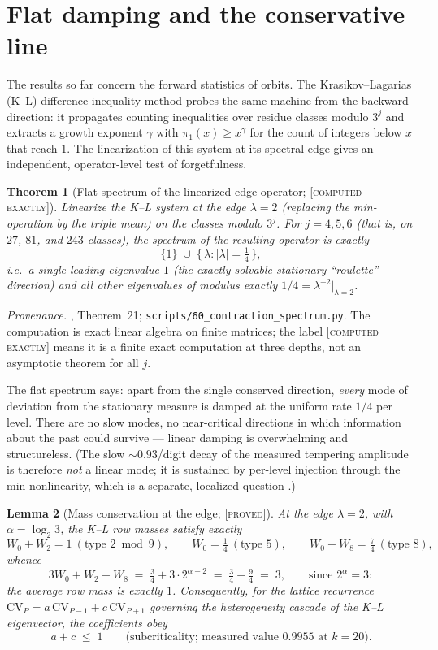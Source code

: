 \documentclass[11pt]{article}
\newtheorem{theorem}{Theorem}[section]
\newtheorem{lemma}[theorem]{Lemma}
\theoremstyle{definition}
\newcommand{\PROVED}{\textup{[\textsc{proved}]}}
\newcommand{\COMPUTED}{\textup{[\textsc{computed exactly}]}}
\begin{document}
\section{Flat damping and the conservative line}

The results so far concern the forward statistics of orbits. The Krasikov--Lagarias
(K--L) difference-inequality method \cite{KrasikovLagarias2003} probes the same machine
from the backward direction: it propagates counting inequalities over residue classes
modulo $3^j$ and extracts a growth exponent $\gamma$ with
$\pi_1(x) \geq x^{\gamma}$ for the count of integers below $x$ that reach $1$. The
linearization of this system at its spectral edge gives an independent, operator-level
test of forgetfulness.

\begin{theorem}[Flat spectrum of the linearized edge operator; \COMPUTED]\label{thm:spectrum}
Linearize the K--L system at the edge $\lambda = 2$ (replacing the min-operation by the
triple mean) on the classes modulo $3^j$. For $j = 4, 5, 6$ (that is, on $27$, $81$,
and $243$ classes), the spectrum of the resulting operator is exactly
\[
\{1\} \;\cup\; \{\,\lambda : |\lambda| = \tfrac14\,\},
\]
i.e.\ a single leading eigenvalue $1$ (the exactly solvable stationary ``roulette''
direction) and \emph{all} other eigenvalues of modulus exactly
$1/4 = \lambda^{-2}\big|_{\lambda = 2}$.
\end{theorem}

\emph{Provenance.} \cite{Note2026}, Theorem~21; \texttt{scripts/60\_contraction\_spectrum.py}.
The computation is exact linear algebra on finite matrices; the label \COMPUTED{} means
it is a finite exact computation at three depths, not an asymptotic theorem for all $j$.

The flat spectrum says: apart from the single conserved direction, \emph{every} mode of
deviation from the stationary measure is damped at the uniform rate $1/4$ per level.
There are no slow modes, no near-critical directions in which information about the past
could survive --- linear damping is overwhelming and structureless. (The slow
$\sim 0.93$/digit decay of the measured tempering amplitude is therefore \emph{not} a
linear mode; it is sustained by per-level injection through the min-nonlinearity, which
is a separate, localized question \cite{Note2026}.)

\begin{lemma}[Mass conservation at the edge; \PROVED]\label{lem:mass}
At the edge $\lambda = 2$, with $\alpha = \log_2 3$, the K--L row masses satisfy
exactly
\[
W_0 + W_2 = 1 \ (\text{type } 2 \bmod 9), \qquad
W_0 = \tfrac14 \ (\text{type } 5), \qquad
W_0 + W_8 = \tfrac74 \ (\text{type } 8),
\]
whence
\[
3W_0 + W_2 + W_8 \;=\; \tfrac34 + 3 \cdot 2^{\alpha - 2} \;=\; \tfrac34 + \tfrac94
\;=\; 3,
\qquad \text{since } 2^{\alpha} = 3:
\]
the \emph{average} row mass is exactly $1$. Consequently, for the lattice recurrence
$\mathrm{CV}_P = a\,\mathrm{CV}_{P-1} + c\,\mathrm{CV}_{P+1}$ governing the
heterogeneity cascade of the K--L eigenvector, the coefficients obey
\[
a + c \;\leq\; 1 \qquad \text{(subcriticality; measured value } 0.9955 \text{ at }
k = 20\text{)}.
\]
\end{lemma}
\end{document}
